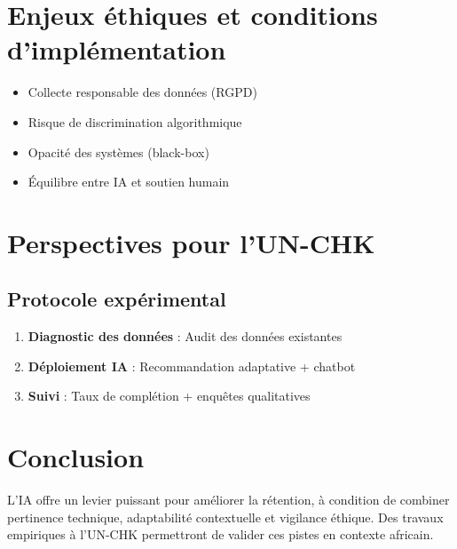 \documentclass[12pt, a4paper]{article}
\begin{document}
	\section{Enjeux éthiques et conditions d'implémentation}
	\label{sec:enjeux}
	
	\begin{itemize}[noitemsep]
		\item Collecte responsable des données (RGPD)
		\item Risque de discrimination algorithmique
		\item Opacité des systèmes (black-box)
		\item Équilibre entre IA et soutien humain
	\end{itemize}
	
	\section{Perspectives pour l'UN-CHK}
	\label{sec:perspectives}
	
	\subsection{Protocole expérimental}
	\begin{enumerate}
		\item \textbf{Diagnostic des données} : Audit des données existantes
		\item \textbf{Déploiement IA} : Recommandation adaptative + chatbot
		\item \textbf{Suivi} : Taux de complétion + enquêtes qualitatives
	\end{enumerate}
	
	\section{Conclusion}
	\label{sec:conclusion}
	
	L'IA offre un levier puissant pour améliorer la rétention, à condition de combiner pertinence technique, adaptabilité contextuelle et vigilance éthique. Des travaux empiriques à l'UN-CHK permettront de valider ces pistes en contexte africain.
	
	
	
\end{document}

